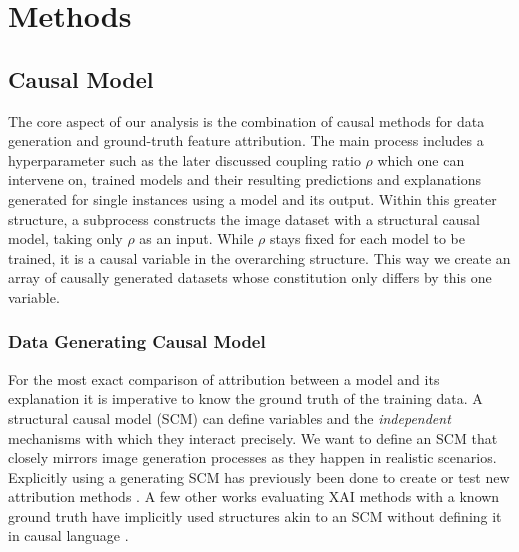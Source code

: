 \chapter{Methods}\label{chapter:method}

\section{Causal Model}\label{section:causal_model}
The core aspect of our analysis is the combination of causal methods for data generation and ground-truth feature attribution. 
The main process includes a hyperparameter such as the later discussed coupling ratio $\rho$ which one can intervene on, trained models and their resulting predictions and explanations generated for single instances using a model and its output. 
Within this greater structure, a subprocess constructs the image dataset with a structural causal model, taking only $\rho$ as an input. While $\rho$ stays fixed for each model to be trained, it is a causal variable in the overarching structure. This way we create an array of causally generated datasets whose constitution only differs by this one variable. 

\subsection{Data Generating Causal Model}\label{section:data_gen_causal_model}
For the most exact comparison of attribution between a model and its explanation it is imperative to know the ground truth of the training data. A structural causal model (SCM) can define variables and the \textit{independent} mechanisms with which they interact precisely. We want to define an SCM that closely mirrors image generation processes as they happen in realistic scenarios. 
Explicitly using a generating SCM has previously been done to create or test new attribution methods \cite{Parafita2019, Wilming2023, Clark2023, Goyal2019, Reimers2019, Reimers2020}. A few other works evaluating XAI methods with a known ground truth have implicitly used structures akin to an SCM without defining it in causal language \cite{Kim2018, Yang2019, Arras2022}. 

